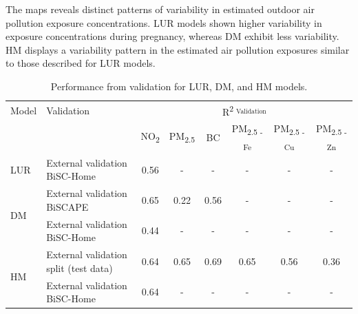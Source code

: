 \documentclass{article}
\begin{document}
The maps reveals distinct patterns of variability in estimated outdoor air pollution exposure concentrations. LUR models shown higher variability in exposure concentrations during pregnancy, whereas DM exhibit less variability. HM displays a variability pattern in the estimated air pollution exposures similar to those described for LUR models.\\

\begin{table}[h!]
\centering
    \caption{Performance from validation for LUR, DM, and HM models.}
    \label{table2}
    \begin{tabular}{llcccccc}
    \toprule
         Model & Validation & \multicolumn{6}{c}{R\textsuperscript{2 \textsubscript{Validation}}} \\
         \cmidrule(lr){3-8}
         & & NO\textsubscript{2} & PM\textsubscript{2.5} & BC & PM\textsubscript{2.5 - Fe} & PM\textsubscript{2.5 - Cu} & PM\textsubscript{2.5 - Zn} \\
    \midrule
         LUR & External validation BiSC-Home & 0.56 & - & - & - & - & - \\
         \midrule %
         \multirow{2}{*}{DM} & External validation BiSCAPE & 0.65 & 0.22 & 0.56 & - & - & - \\
         & External validation BiSC-Home & 0.44 & - & - & - & - & - \\ 
         \midrule %
         \multirow{2}{*}{HM} & External validation split (test data) & 0.64 & 0.65 & 0.69 & 0.65 & 0.56 & 0.36 \\
         & External validation BiSC-Home & 0.64 & - & - & - & - & - \\ 
    \bottomrule
    \end{tabular}
\end{table}
\end{document}
